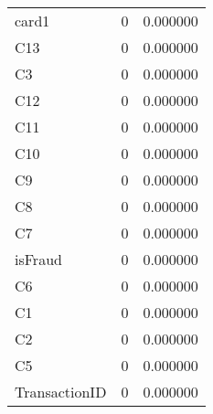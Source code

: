 \begin{tabular}{lrr}
card1 & 0 & 0.000000 \\
C13 & 0 & 0.000000 \\
C3 & 0 & 0.000000 \\
C12 & 0 & 0.000000 \\
C11 & 0 & 0.000000 \\
C10 & 0 & 0.000000 \\
C9 & 0 & 0.000000 \\
C8 & 0 & 0.000000 \\
C7 & 0 & 0.000000 \\
isFraud & 0 & 0.000000 \\
C6 & 0 & 0.000000 \\
C1 & 0 & 0.000000 \\
C2 & 0 & 0.000000 \\
C5 & 0 & 0.000000 \\
TransactionID & 0 & 0.000000 \\
\end{tabular}
